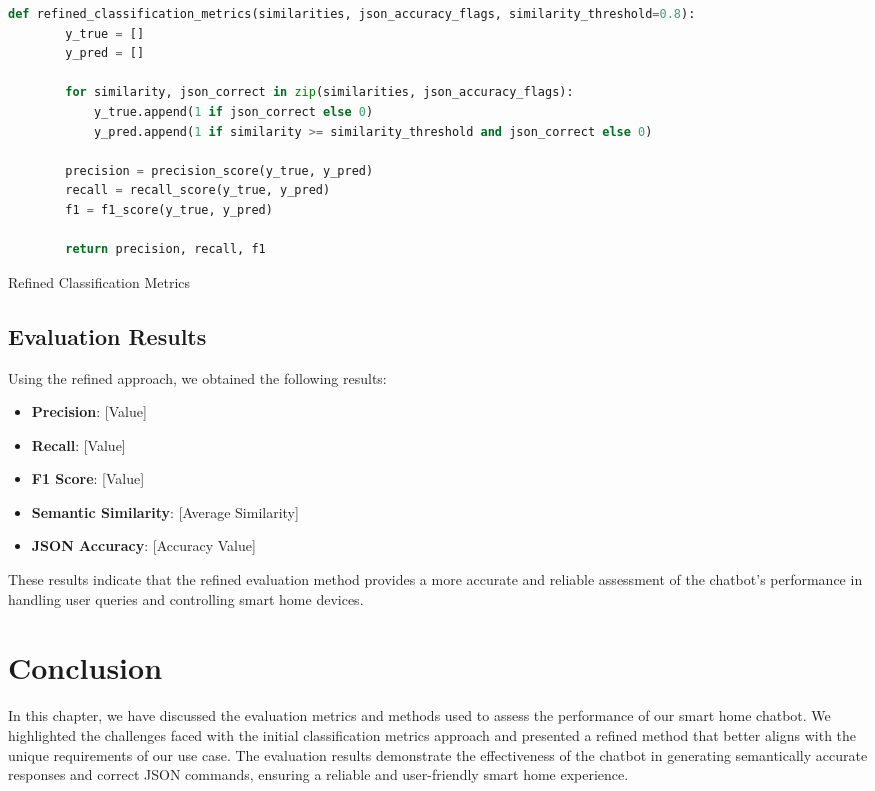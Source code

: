 \begin{Listing}
    \begin{lstlisting}[language=Python]
    def refined_classification_metrics(similarities, json_accuracy_flags, similarity_threshold=0.8):
        y_true = []
        y_pred = []
    
        for similarity, json_correct in zip(similarities, json_accuracy_flags):
            y_true.append(1 if json_correct else 0)
            y_pred.append(1 if similarity >= similarity_threshold and json_correct else 0)
    
        precision = precision_score(y_true, y_pred)
        recall = recall_score(y_true, y_pred)
        f1 = f1_score(y_true, y_pred)
    
        return precision, recall, f1
  \end{lstlisting}
    \caption{Refined Classification Metrics}
    \label{lst:classificationRefined}
\end{Listing}

\subsection{Evaluation Results}

Using the refined approach, we obtained the following results:
\begin{itemize}
    \item \textbf{Precision}: [Value]
    \item \textbf{Recall}: [Value]
    \item \textbf{F1 Score}: [Value]
    \item \textbf{Semantic Similarity}: [Average Similarity]
    \item \textbf{JSON Accuracy}: [Accuracy Value]
\end{itemize}

These results indicate that the refined evaluation method provides a more accurate and reliable assessment of the chatbot's performance in handling user queries and controlling smart home devices.

\section{Conclusion}

In this chapter, we have discussed the evaluation metrics and methods used to assess the performance of our smart home chatbot. We highlighted the challenges faced with the initial classification metrics approach and presented a refined method that better aligns with the unique requirements of our use case. The evaluation results demonstrate the effectiveness of the chatbot in generating semantically accurate responses and correct JSON commands, ensuring a reliable and user-friendly smart home experience.

